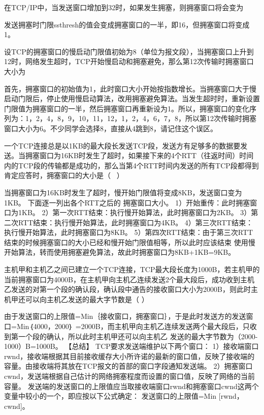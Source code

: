 \question 在TCP/IP中，当发送窗口增加到32时，如果发生拥塞，则拥塞窗口将会变为
\par{}
\begin{solution}发送拥塞时门限ssthresh的值会变成拥塞窗口的一半，即16，但拥塞窗口将变成1。
\end{solution}
\question 设TCP的拥塞窗口的慢启动门限值初始为8（单位为报文段），当拥塞窗口上升到12时，网络发生超时，TCP开始慢启动和拥塞避免，那么第12次传输时拥塞窗口大小为
\par{}
\begin{solution}首先，拥塞窗口的初始值为1，此时窗口大小开始按指数增长。当拥塞窗口大于慢启动门限后，停止使用慢启动算法，改用拥塞避免算法。当发生超时时，重新设置门限值为拥塞窗口的一半，然后拥塞窗口再重新设为1。所以，拥塞窗口的变化序列为：1，2，4，8，9，10，11，12，1，2，4，6，7，8，所以第12次传输时拥塞窗口大小为6。不少同学会选择8，直接从4跳到8，请记住这个误区。
\end{solution}
\question 一个TCP连接总是以1KB的最大段长发送TCP段，发送方有足够多的数据要发送。当拥塞窗口为16KB时发生了超时，如果接下来的4个RTT（往返时间）时间内的TCP段的传输都是成功的，那么当第4个RTT时间内发送的所有TCP段都得到肯定应答时，拥塞窗口的大小是（
~）
\par{}
\begin{solution}当拥塞窗口为16KB时发生了超时，慢开始门限值将变成8KB，发送窗口变为1KB。
下面逐一列出各个RTT之后的 拥塞窗口大小。
1）开始重传：此时拥塞窗口为1KB。
2）第一次RTT结束：执行慢开始算法，此时拥塞窗口为2KB。
3）第二次RTT结束：执行慢开始算法，此时拥塞窗口为4KB。
4）第三次RTT结束：执行慢开始算法，此时拥塞窗口为8KB。
5）第四次RTT结束：由于第三次RTT结束的时候拥塞窗口的大小已经和慢开始门限值相等，所以此时应该结束
使用慢开始算法，转而使用拥塞避免算法，故此时拥塞窗口为8KB+1KB=9KB。
\end{solution}
\question 主机甲和主机乙之间已建立一个TCP连接，TCP最大段长度为1000B，若主机甲的当前拥塞窗口为4000B，在主机甲向主机乙连续发送2个最大段后，成功收到主机乙发送的对第一个段的确认段，确认段中通告的接收窗口大小为2000B，则此时主机甲还可以向主机乙发送的最大字节数是（
）
\par{}
\begin{solution}由于发送窗口的上限值=Min｛接收窗口，拥塞窗口｝，于是此时发送方的发送窗口=Min｛4000，2000｝
=2000B，而主机甲向主机乙连续发送两个最大段后，只收到第一个段的确认，所以此时主机甲还可以向主机乙
发送的最大字节数为（2000-1000）B=1000B。 【总结】
TCP要求发送端维护以下两个窗口：
1）接收端窗口rwnd，接收端根据其目前接收缓存大小所许诺的最新的窗口值，反映了接收端的容量。由接收端将其放在TCP报文的首部的窗口字段通知发送端。
2）拥塞窗口cwnd，发送端根据自己估计的网络拥塞程度而设置的窗口值，反映了网络的当前容量。
发送端的发送窗口的上限值应当取接收端窗口rwnd和拥塞窗口cwnd这两个变量中较小的一个，即应按以下公式确定：
发送窗口的上限值=Min {[}rwnd，cwnd{]}。
\end{solution}

